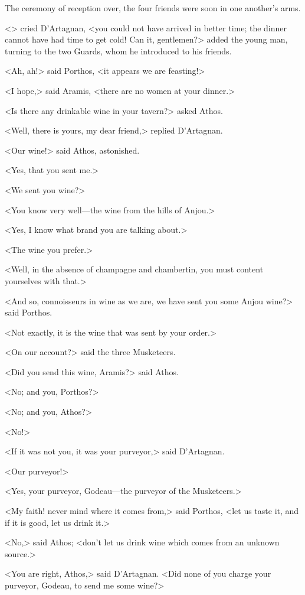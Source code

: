 The ceremony of reception over, the four friends were soon in one another's arms. 

<> cried D'Artagnan, <you could not have arrived in better time; the dinner cannot have had time to get cold! Can it, gentlemen?> added the young man, turning to the two Guards, whom he introduced to his friends. 

<Ah, ah!> said Porthos, <it appears we are feasting!> 

<I hope,> said Aramis, <there are no women at your dinner.> 

<Is there any drinkable wine in your tavern?> asked Athos. 

<Well,  there is yours, my dear friend,> replied D'Artagnan. 

<Our wine!> said Athos, astonished. 

<Yes, that you sent me.> 

<We sent you wine?> 

<You know very well—the wine from the hills of Anjou.> 

<Yes, I know what brand you are talking about.> 

<The wine you prefer.> 

<Well, in the absence of champagne and chambertin, you must content yourselves with that.> 

<And so, connoisseurs in wine as we are, we have sent you some Anjou wine?> said Porthos. 

<Not exactly, it is the wine that was sent by your order.> 

<On our account?> said the three Musketeers. 

<Did you send this wine, Aramis?> said Athos. 

<No; and you, Porthos?> 

<No; and you, Athos?> 

<No!> 

<If it was not you, it was your purveyor,> said D'Artagnan. 

<Our purveyor!> 

<Yes, your purveyor, Godeau—the purveyor of the Musketeers.> 

<My faith! never mind where it comes from,> said Porthos, <let us taste it, and if it is good, let us drink it.> 

<No,> said Athos; <don't let us drink wine which comes from an unknown source.> 

<You are right, Athos,> said D'Artagnan. <Did none of you charge your purveyor, Godeau, to send me some wine?> 

